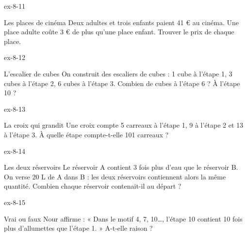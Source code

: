 \begin{blocLivre}{ex-8-11}\begin{exercice}[3]{Les places de cinéma}
Deux adultes et trois enfants paient 41 € au cinéma. Une place adulte coûte 3 € de plus qu’une place enfant. Trouver le prix de chaque place.
\end{exercice}\end{blocLivre}
\begin{blocLivre}{ex-8-12}\begin{exercice}[3]{L’escalier de cubes}
On construit des escaliers de cubes : 1 cube à l’étape 1, 3 cubes à l’étape 2, 6 cubes à l’étape 3. Combien de cubes à l’étape 6 ? À l’étape 10 ?
\label{fig-ex-8-12}
\end{exercice}\end{blocLivre}
\begin{blocLivre}{ex-8-13}\begin{exercice}[3]{La croix qui grandit}
Une croix compte 5 carreaux à l’étape 1, 9 à l’étape 2 et 13 à l’étape 3. À quelle étape compte-t-elle 101 carreaux ?
\label{fig-ex-8-13}
\end{exercice}\end{blocLivre}
\begin{blocLivre}{ex-8-14}\begin{exercice}[3]{Les deux réservoirs}
Le réservoir A contient 3 fois plus d’eau que le réservoir B. On verse 20 L de A dans B : les deux réservoirs contiennent alors la même quantité. Combien chaque réservoir contenait-il au départ ?
\end{exercice}\end{blocLivre}
\begin{blocLivre}{ex-8-15}\begin{exercice}[3]{Vrai ou faux}
Nour affirme : « Dans le motif 4, 7, 10…, l’étape 10 contient 10 fois plus d’allumettes que l’étape 1. » A-t-elle raison ?
\end{exercice}\end{blocLivre}

\clearpage
